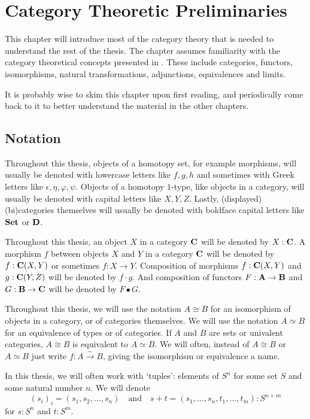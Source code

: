 \chapter{Category Theoretic Preliminaries}\label{ch:category-theory}

This chapter will introduce most of the category theory that is needed to understand the rest of the thesis. The chapter assumes familiarity with the category theoretical concepts presented in \autocite{CT4P}. These include categories, functors, isomorphisms, natural transformations, adjunctions, equivalences and limits.

It is probably wise to skim this chapter upon first reading, and periodically come back to it to better understand the material in the other chapters.

\section{Notation}
Throughout this thesis, objects of a homotopy set, for example morphisms, will usually be denoted with lowercase letters like $ f, g, h $ and sometimes with Greek letters like $ \epsilon, \eta, \varphi, \psi $. Objects of a homotopy $ 1 $-type, like objects in a category, will usually be denoted with capital letters like $ X, Y, Z $. Lastly, (displayed) (bi)categories themselves will usually be denoted with boldface capital letters like $ \mathbf{Set} $ or $ \mathbf{D} $.

Throughout this thesis, an object $ X $ in a category $ \mathbf{C} $ will be denoted by $ X : \mathbf{C} $. A morphism $ f $ between objects $ X $ and $ Y $ in a category $ \mathbf{C} $ will be denoted by $ f: \mathbf{C}(X, Y) $ or sometimes $ f: X \to Y $. Composition of morphisms $ f: \mathbf{C}(X, Y) $ and $ g: \mathbf{C}(Y, Z) $ will be denoted by $ f \cdot g $. And composition of functors $ F: \mathbf{A} \to \mathbf{B} $ and $ G: \mathbf{B} \to \mathbf{C} $ will be denoted by $ F \bullet G $.

Throughout this thesis, we will use the notation $ A \cong B $ for an isomorphism of objects in a category, or of categories themselves. We will use the notation $ A \simeq B $ for an equivalence of types or of categories. If $ A $ and $ B $ are sets or univalent categories, $ A \cong B $ is equivalent to $ A \simeq B $. We will often, instead of $ A \cong B $ or $ A \simeq B $ just write $ f: A \xrightarrow \sim B $, giving the isomorphism or equivalence a name.

In this thesis, we will often work with `tuples': elements of $ S^n $ for some set $ S $ and some natural number $ n $. We will denote
\[ (s_i)_i = (s_1, s_2, \dots, s_n) \quad \text{and} \quad s + t = (s_1, \dots, s_n, t_1, \dots, t_m) : S^{n + m} \]
for $ s : S^n $ and $ t : S^m $.

